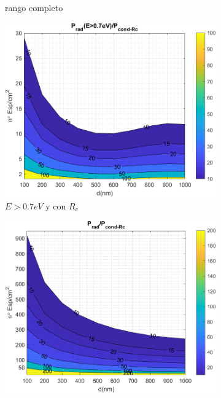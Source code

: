 \begin{figure}[H]
\begin{subfigure}[b]{0.49\textwidth}
		\caption{rango completo}
		\label{fig:rel_SiSiO2Ge_full}
	\end{subfigure}
	\hfill
	\begin{subfigure}[b]{0.49\textwidth}
		\centering
		\includegraphics[width=1.00\textwidth]{figuras/Resultados/RelacionCondRad/SiGe_Rc.png}
		\caption{$E>0.7eV$ y con $R_c$}
		\label{fig:rel_SiSiO2Ge_Rc}
	\end{subfigure}
	\hfill
	\begin{subfigure}[b]{0.49\textwidth}
		\centering
		\includegraphics[width=1.00\textwidth]{figuras/Resultados/RelacionCondRad/SiGe_Rc_full_10.png}

\end{subfigure}
\end{figure}
